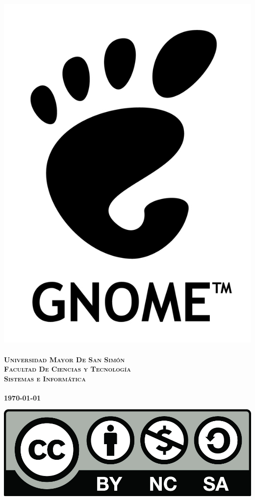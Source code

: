 \documentclass[12pt,letterpaper]{book}
\begin{document}
 \begin{titlepage}
	\thispagestyle{empty}
	\begin{center}
		\includegraphics[scale=0.4]{img/gnome-logo2.jpg} \\
		~\\
		\Large{\textsc{\bf Universidad Mayor De San Simón}}\\
		\large{\textsc{\bf Facultad De Ciencias y Tecnología}}\\
		\large{\textsc{\bf Sistemas e Informática}}\\
		~\\
		\small{\bf \today}
	\end{center}
 	\vfill
	\begin{center}
	\includegraphics[scale=0.4]{img/by-nc-sa.jpg}\\

\end{center}
\end{titlepage}
\end{document}

